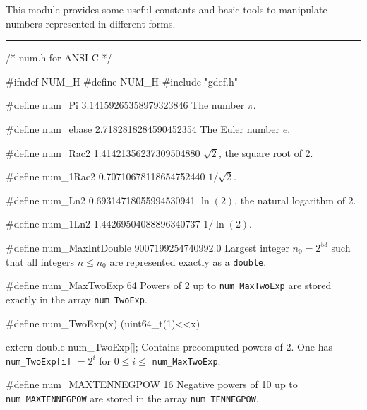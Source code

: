 
This module provides some useful constants and basic tools to
manipulate numbers represented in different forms.

\bigskip\hrule

\code\hide
/* num.h for ANSI C */

#ifndef NUM_H
#define NUM_H
\endhide
#include "gdef.h"
\endcode

\code

#define num_Pi     3.14159265358979323846
\endcode
  \tab The number $\pi$.
  \endtab
\code

#define num_ebase  2.7182818284590452354
\endcode
  \tab The Euler number $e$.
  \endtab
\code

#define num_Rac2   1.41421356237309504880
\endcode
  \tab $\sqrt{2}$, the square root of 2.
  \endtab
\code

#define num_1Rac2  0.70710678118654752440
\endcode
  \tab $1/\sqrt{2}$.
  \endtab
\code

#define num_Ln2    0.69314718055994530941
\endcode
  \tab $\ln(2)$, the natural logarithm of 2.
  \endtab
\code

#define num_1Ln2   1.44269504088896340737
\endcode
  \tab $1 / \ln(2)$.
  \endtab
\code

#define num_MaxIntDouble   9007199254740992.0
\endcode
  \tab Largest integer $n_0 = 2^{53}$ such that all integers
  $n \le n_0$ are represented  exactly as a {\tt double}.
  \endtab


\code

#define num_MaxTwoExp   64
\endcode
  \tab Powers of 2 up to {\tt num\_MaxTwoExp} are stored exactly
  in the array {\tt num\_TwoExp}.
  \endtab
\code

#define num_TwoExp(x) (uint64_t(1)<<x)

extern double num_TwoExp[];
\endcode
  \tab  Contains precomputed powers of 2.
  One has {\tt num\_TwoExp[i]} $= 2^i$ for $0 \le i \le$ {\tt num\_MaxTwoExp}.
\endtab
\code

#define num_MAXTENNEGPOW   16
\endcode
  \tab Negative powers of 10 up to {\tt num\_MAXTENNEGPOW} are stored
  in the array {\tt num\_TENNEGPOW}.
  \endtab
\code

